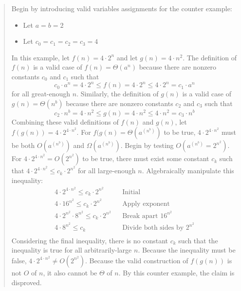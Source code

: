 \documentclass[11pt]{article}
\begin{document}
\begin{enumerate}
\begin{enumerate}
\begin{itemize}
\begin{quote}
            Begin by introducing valid variables assignments for the counter example:
            \begin{itemize}
                \item Let $a = b = 2$
                \item Let $c_0 = c_1 = c_2 = c_3 = 4$
            \end{itemize}
            In this example, let $f(n) = 4 \cdot 2^n$ and let $g(n) = 4 \cdot n^2$. \newline
            The definition of $f(n)$ is a valid case of $f(n) = \Theta(a^n)$ because there are nonzero constants $c_0$ and $c_1$ such that 
            $$c_0 \cdot a^n = 4 \cdot 2^n \leq f(n) = 4 \cdot 2^n \leq 4 \cdot 2^n = c_1 \cdot a^n$$ 
            for all great-enough $n$. \newline
            Similarly, the definition of $g(n)$ is a valid case of $g(n) = \Theta(n^b)$ because there are nonzero constants $c_2$ and $c_3$ such that 
            $$c_2 \cdot n^b = 4 \cdot n^2 \leq g(n) = 4 \cdot n^2 \leq 4 \cdot n^2 = c_3 \cdot n^b$$ \newline
            Combining these valid definitions of $f(n)$ and $g(n)$, let $f(g(n)) = 4 \cdot 2^{4 \cdot n^2}$. \newline
            For $f(g(n) = \Theta(a^{(n^b)})$ to be true, $4 \cdot 2^{4 \cdot n^2}$ must be both $O(a^{(n^b)})$ and $\Omega(a^{(n^b)})$. Begin by testing $O(a^{(n^b)} = 2^{n^2})$. \newline
            For $4 \cdot 2^{4 \cdot n^2} = O(2^{n^2})$ to be true, there must exist some constant $c_k$ such that $4 \cdot 2^{4 \cdot n^2} \leq c_k \cdot 2^{n^2}$ for all large-enough $n$. \newline
            Algebraically manipulate this inequality: 
            \begin{align*}
                && 4 \cdot 2^{4 \cdot n^2} \leq c_k \cdot 2^{n^2} && \text{Initial} && \\
                && 4 \cdot 16^{n^2} \leq c_k \cdot 2^{n^2} && \text{Apply exponent} &&  \\
                && 4 \cdot 2^{n^2} \cdot 8^{n^2} \leq c_k \cdot 2^{n^2} && \text{Break apart $16^{n^2}$} &&  \\
                && 4 \cdot 8^{n^2} \leq c_k && \text{Divide both sides by $2^{n^2}$} &&  \\
            \end{align*}
            Considering the final inequality, there is no constant $c_k$ such that the inequality is true for all arbitrarily-large $n$. Because the inequality must be false, $4 \cdot 2^{4 \cdot n^2} \neq O(2^{n^2})$. Because the valid construction of $f(g(n))$ is not $O$ of $n$, it also cannot be $\Theta$ of $n$. By this counter example, the claim is disproved.

\end{quote}
\end{itemize}
\end{enumerate}
\end{enumerate}
\end{document}
